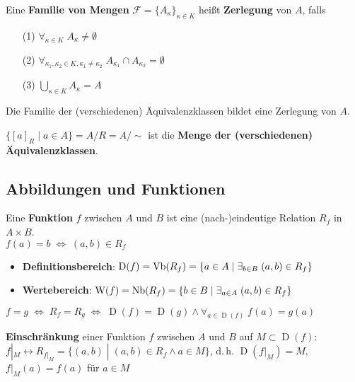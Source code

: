 \linie
\pagebreak

Eine \textbf{Familie von Mengen} $\mathcal{F} = \{A_\kappa\}_{\kappa \in K}$
heißt \textbf{Zerlegung} von $A$, falls

\begin{itemize}
    \item[(1)] $\forall_{\kappa \in K}\; A_\kappa \not= \emptyset$
    
    \item[(2)] $\forall_{\kappa_1, \kappa_2 \in K, \kappa_1 \not= \kappa_2}\;
    A_{\kappa_1} \cap A_{\kappa_2} = \emptyset$
    
    \item[(3)] $\bigcup_{\kappa \in K} A_\kappa = A$
\end{itemize}

Die Familie der (verschiedenen) Äquivalenzklassen bildet eine Zerlegung von
$A$.

$\{[a]_R \;|\; a \in A\} = A/R = A/\!\!\sim$ ist die \textbf{Menge der
(verschiedenen) Äquivalenzklassen}.

\subsection{%
    Abbildungen und Funktionen%
}

Eine \textbf{Funktion} $f$ zwischen $A$ und $B$ ist eine (nach-)eindeutige
Relation $R_f$ in $A \times B$. \\
$f(a) = b \;\Leftrightarrow\; (a, b) \in R_f$

\begin{itemize}
    \item \textbf{Definitionsbereich}:
    $\operatorname{D}(f) = \operatorname{Vb}(R_f) =
    \{a \in A \;|\; \exists_{b \in B}\; (a,b) \in R_f\}$
    
    \item \textbf{Wertebereich}:
    $\operatorname{W}(f) = \operatorname{Nb}(R_f) =
    \{b \in B \;|\; \exists_{a \in A}\; (a,b) \in R_f\}$
\end{itemize}

$f = g \;\Leftrightarrow\; R_f = R_g \;\Leftrightarrow\;
\operatorname{D}(f) = \operatorname{D}(g) \land
\forall_{a \in \operatorname{D}(f)}\; f(a) = g(a)$

\textbf{Einschränkung} einer Funktion $f$ zwischen $A$ und $B$ auf
$M \subset \operatorname{D}(f)$: \\
$f|_M \leftrightarrow R_{f|_M} = \{(a,b) \;|\; (a,b) \in R_f \land a \in M\}$,
d.\,h. $\operatorname{D}(f|_M) = M$, $f|_{M}(a) = f(a)$ für $a \in M$

